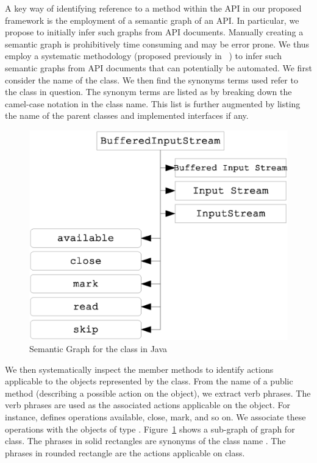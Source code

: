 A key way of identifying reference to a method within the API in our proposed framework is the employment of a semantic graph of an API.
In particular, we propose to initially infer such graphs from API documents.
Manually creating a semantic graph is prohibitively time consuming and may be error prone.
We thus employ a systematic methodology (proposed previously in ~\cite{pandita13:WHYPER}) to infer such semantic graphs from API documents that can potentially be automated.
We first consider the name of the class.
We then find the synonyms terms used refer to the class in question.
The synonym terms are listed as by breaking down the camel-case notation in the class name.
This list is further augmented by listing the name of the parent classes and implemented interfaces if any. 

\begin{figure}
	\centering
		\includegraphics[scale=0.4]{KnowledgeGraph.eps}
	\caption{Semantic Graph for the  class in Java}
	\label{fig:knowledge}
\end{figure} 


We then systematically inspect the member methods to identify actions applicable to the objects represented by the class. From the name of a public method (describing a possible action on the object), we extract verb phrases. The verb phrases are used as the associated actions applicable on the object. For instance,  defines operations available, close, mark, and so on. We associate these operations with the objects of type . Figure~\ref{fig:knowledge} shows a sub-graph of  graph for  class. The phrases in solid rectangles are synonyms of the class name . The phrases in rounded rectangle are the actions applicable on  class.
  


